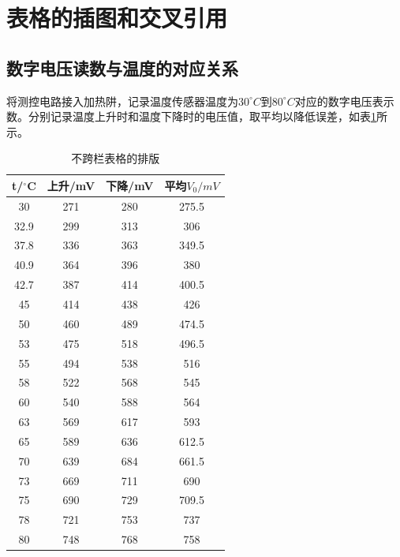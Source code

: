 \documentclass[10pt,a4paper,twocolumn,twoside,UTF8]{ctexart}
\begin{document}
\section{表格的插图和交叉引用}

	\subsection{数字电压读数与温度的对应关系}
	将测控电路接入加热阱，记录温度传感器温度为$30^{\circ}C到80^{\circ}C$对应的数字电压表示数。分别记录温度上升时和温度下降时的电压值，取平均以降低误差，如表\ref{tab:addlabel}所示。


	\begin{table}[htbp]
	  \centering
	    \begin{tabular}{cccc}
	    \toprule
	    t/$^{\circ}$C & 上升/mV & 下降/mV & 平均$V_0/mV$ \\
	    \midrule
	    30    & 271   & 280   & 275.5 \\
	    32.9  & 299   & 313   & 306 \\
	    37.8  & 336   & 363   & 349.5 \\
	    40.9  & 364   & 396   & 380 \\
	    42.7  & 387   & 414   & 400.5 \\
	    45    & 414   & 438   & 426 \\
	    50    & 460   & 489   & 474.5 \\
	    53    & 475   & 518   & 496.5 \\
	    55    & 494   & 538   & 516 \\
	    58    & 522   & 568   & 545 \\
	    60    & 540   & 588   & 564 \\
	    63    & 569   & 617   & 593 \\
	    65    & 589   & 636   & 612.5 \\
	    70    & 639   & 684   & 661.5 \\
	    73    & 669   & 711   & 690 \\
	    75    & 690   & 729   & 709.5 \\
	    78    & 721   & 753   & 737 \\
	    80    & 748   & 768   & 758 \\
	    \bottomrule
	    \end{tabular}%
	  \caption{不跨栏表格的排版}
	  \label{tab:addlabel}%
	\end{table}%
\end{document}
